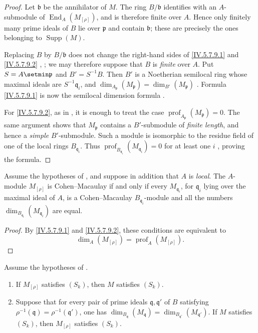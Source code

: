 \begin{proof}
Let $\mathfrak b$ be the annihilator of $M$.  The ring
$B/\mathfrak b$ identifies with an $A$-submodule of
$\operatorname{End}_A(M_{[\rho]})$, and is therefore finite over
$A$.  Hence only finitely many prime ideals of $B$ lie over
$\mathfrak p$ and contain $\mathfrak b$; these are precisely the
ones belonging to $\operatorname{Supp}(M)$.

Replacing $B$ by $B/\mathfrak b$ does not change the right-hand
sides of \eqref{IV.5.7.9.1} and \eqref{IV.5.7.9.2}
, ; we may therefore suppose
that $B$ is \emph{finite} over $A$.  Put $S=A\setmin\mathfrak p$ and
$B'=S^{-1}B$.  Then $B'$ is a Noetherian semilocal ring whose
maximal ideals are $S^{-1}\mathfrak q_i$, and $\dim_{A_{\mathfrak p}}(M_{\mathfrak p})
=\dim_{B'}(M_{\mathfrak p})$
.  Formula \eqref{IV.5.7.9.1} is now the
semilocal dimension formula .

For \eqref{IV.5.7.9.2}, as in , it is enough to
treat the case
$\operatorname{prof}_{A_{\mathfrak p}}(M_{\mathfrak p})=0$.  The
same argument shows that $M_{\mathfrak p}$ contains a
$B'$-submodule of \emph{finite length}, and hence a \emph{simple}
$B'$-submodule.  Such a module is isomorphic to the residue field
of one of the local rings $B_{\mathfrak q_i}$.  Thus $\operatorname{prof}_{B_{\mathfrak q_i}}(M_{\mathfrak q_i})=0$
for at least one $i$ , proving the formula.
\end{proof}

\begin{corollary}[5.7.10]
\label{IV.5.7.10}
Assume the hypotheses of , and suppose in addition
that $A$ is \emph{local}.  The $A$-module $M_{[\rho]}$ is Cohen--Macaulay
if and only if every $M_{\mathfrak q_i}$, for
$\mathfrak q_i$ lying over the maximal ideal of $A$, is a
Cohen--Macaulay $B_{\mathfrak q_i}$-module and all the numbers
$\dim_{B_{\mathfrak q_i}}(M_{\mathfrak q_i})$ are equal.
\end{corollary}

\begin{proof}
By \eqref{IV.5.7.9.1} and \eqref{IV.5.7.9.2}, these conditions are
equivalent to
\[
\dim_A(M_{[\rho]})
 =\operatorname{prof}_A(M_{[\rho]}).
\]
\end{proof}

\begin{corollary}[5.7.11]
\label{IV.5.7.11}
Assume the hypotheses of .
\begin{enumerate}[{\rm(i)}]
\item
{}
\label{IV.5.7.11.i}
If $M_{[\rho]}$ satisfies $(S_k)$, then $M$ satisfies $(S_k)$.

\item
{}
\label{IV.5.7.11.ii}
Suppose that for every pair of prime ideals
$\mathfrak q,\mathfrak q'$ of $B$ satisfying
$\rho^{-1}(\mathfrak q)=\rho^{-1}(\mathfrak q')$, one has $\dim_{B_{\mathfrak q}}(M_{\mathfrak q})
=\dim_{B_{\mathfrak q'}}(M_{\mathfrak q'})$.
If $M$ satisfies $(S_k)$, then $M_{[\rho]}$ satisfies $(S_k)$.
\end{enumerate}
\end{corollary}

